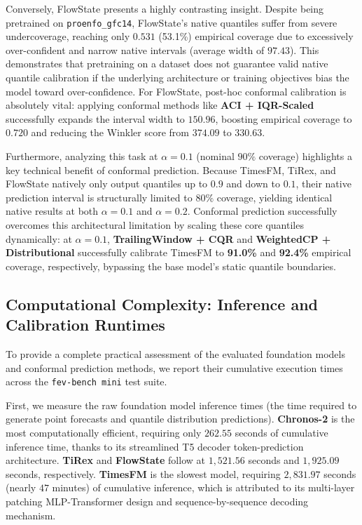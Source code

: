 \documentclass[12pt, a4paper]{article}
\begin{document}
Conversely, FlowState presents a highly contrasting insight. Despite being pretrained on \texttt{proenfo\_gfc14}, FlowState's native quantiles suffer from severe undercoverage, reaching only \(0.531\) (53.1\%) empirical coverage due to excessively over-confident and narrow native intervals (average width of \(97.43\)). This demonstrates that pretraining on a dataset does not guarantee valid native quantile calibration if the underlying architecture or training objectives bias the model toward over-confidence. For FlowState, post-hoc conformal calibration is absolutely vital: applying conformal methods like \textbf{ACI + IQR-Scaled} successfully expands the interval width to \(150.96\), boosting empirical coverage to \(0.720\) and reducing the Winkler score from \(374.09\) to \(330.63\).

Furthermore, analyzing this task at \(\alpha = 0.1\) (nominal \(90\%\) coverage) highlights a key technical benefit of conformal prediction. Because TimesFM, TiRex, and FlowState natively only output quantiles up to \(0.9\) and down to \(0.1\), their native prediction interval is structurally limited to \(80\%\) coverage, yielding identical native results at both \(\alpha = 0.1\) and \(\alpha = 0.2\). Conformal prediction successfully overcomes this architectural limitation by scaling these core quantiles dynamically: at \(\alpha=0.1\), \textbf{TrailingWindow + CQR} and \textbf{WeightedCP + Distributional} successfully calibrate TimesFM to \textbf{91.0\%} and \textbf{92.4\%} empirical coverage, respectively, bypassing the base model's static quantile boundaries.

\subsection{Computational Complexity: Inference and Calibration Runtimes} \label{subsec:runtimes}
To provide a complete practical assessment of the evaluated foundation models and conformal prediction methods, we report their cumulative execution times across the \texttt{fev-bench mini} test suite.

First, we measure the raw foundation model inference times (the time required to generate point forecasts and quantile distribution predictions). \textbf{Chronos-2} is the most computationally efficient, requiring only \(262.55\) seconds of cumulative inference time, thanks to its streamlined T5 decoder token-prediction architecture. \textbf{TiRex} and \textbf{FlowState} follow at \(1,521.56\) seconds and \(1,925.09\) seconds, respectively. \textbf{TimesFM} is the slowest model, requiring \(2,831.97\) seconds (nearly \(47\) minutes) of cumulative inference, which is attributed to its multi-layer patching MLP-Transformer design and sequence-by-sequence decoding mechanism.
\end{document}
